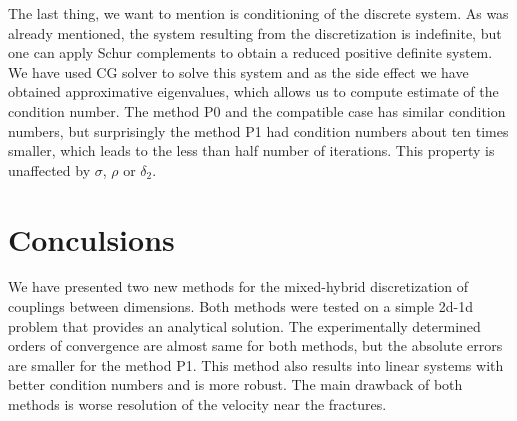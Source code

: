 \documentclass[times]{nlaauth}%
\begin{document}
The last thing, we want to mention is conditioning of the discrete system. As was already mentioned, the system resulting from the 
discretization is indefinite, but one can apply Schur complements to obtain a reduced positive definite system.
We have used CG solver to solve this system and as the side effect we have obtained approximative eigenvalues,
which allows us to compute estimate of the condition number.
The method P0 and the compatible case has similar condition numbers, but surprisingly 
the method P1 had condition numbers about ten times smaller, which leads to
the less than half number of iterations. This property is unaffected by $\sigma$, $\rho$ or $\delta_2$.

\section{Conculsions}
We have presented two new methods for the mixed-hybrid discretization of couplings between dimensions. Both methods 
were tested on a simple 2d-1d problem that provides an analytical solution. The experimentally determined orders of convergence 
are almost same for both methods, but the absolute errors are smaller for the method P1. 
This method also results into  linear systems with better condition numbers and is more robust.
The main drawback of both methods is worse resolution of the velocity near the fractures. 
 






\end{document}
